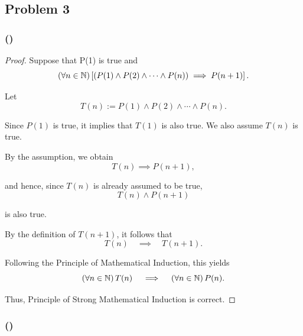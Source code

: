 \subsection{Problem 3}
\subsubsection{()}

\begin{proof}
    Suppose that P(1) is true and 
    \begin{equation*}
        \left(\forall n \in \mathbb{N}\right) \left[\left(P(1) \wedge P(2) \wedge \cdots \wedge P(n)\right) \implies P(n + 1)\right]. 
    \end{equation*}

    Let 
    \begin{equation*}
        T(n) := P(1) \wedge P(2) \wedge \cdots \wedge P(n). 
    \end{equation*}

    Since $P(1)$ is true, it implies that $T(1)$ is also true. 
    We also assume $T(n)$ is true. 

    By the assumption, we obtain
    \begin{equation*}
       T(n) \implies P(n + 1), 
    \end{equation*} 
    
    and hence, since $T(n)$ is already assumed to be true, 
    \begin{equation*}
        T(n) \wedge P(n + 1)
    \end{equation*}

    is also true. 

    By the definition of $T(n + 1)$, it follows that 
    \begin{equation*}
        T(n) \quad \implies \quad T(n + 1). 
    \end{equation*}

    Following the Principle of Mathematical Induction, this yields
    \begin{equation*}
        \left(\forall n \in \mathbb{N}\right) T(n) \quad \implies \quad \left(\forall n \in \mathbb{N}\right) P(n). 
    \end{equation*} 

    Thus, Principle of Strong Mathematical Induction is correct. 

\end{proof}

\newpage

\subsubsection{()}

